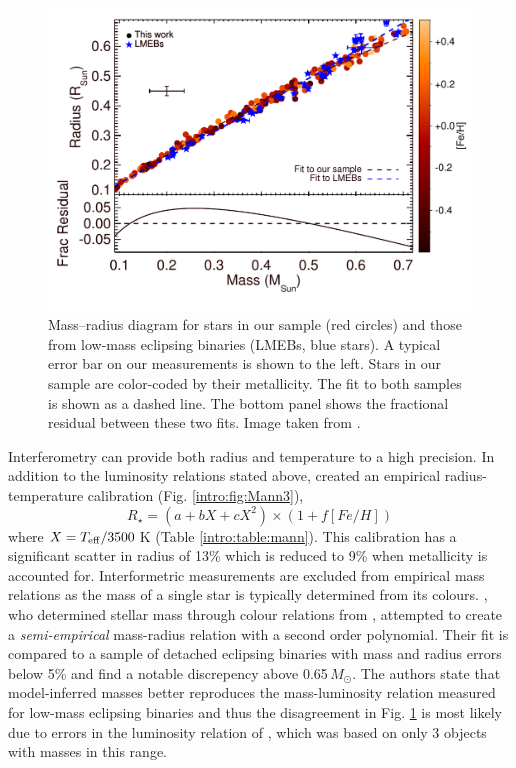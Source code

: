 \begin{figure}
    \centering
    \includegraphics[width=\textwidth]{3-images/f4.pdf}
    \caption{Mass--radius diagram for stars in our sample (red circles) and those from low-mass eclipsing binaries (LMEBs, blue stars). A typical error bar on our measurements is shown to the left. Stars in our sample are color-coded by their metallicity. The fit to both samples is shown as a dashed line. The bottom panel shows the fractional residual between these two fits. Image taken from \protect\citet{2015ApJ...804...64M}.}
    \label{intro:fig:Mann4}
\end{figure}


Interferometry can provide both radius and temperature to a high precision. In addition to the luminosity relations stated above, \citet{2015ApJ...804...64M} created an empirical radius-temperature calibration (Fig. \ref{intro:fig:Mann3}),
%
\begin{equation}
    R_\star = \left( a + bX + cX^2 \right) \times (1 + f[Fe/H])
\end{equation}
%
where $X = T_{\rm eff} / 3500$\,K (Table \ref{intro:table:mann}). This calibration has a significant scatter in radius of 13\% which is reduced to 9\% when metallicity is accounted for.  Interformetric measurements are excluded from empirical mass relations as the mass of a single star is typically determined from its colours. \citet{2015ApJ...804...64M}, who determined stellar mass through colour relations from \citet{2000A&A...364..217D}, attempted to create a \textit{semi-empirical} mass-radius relation with a second order polynomial. Their fit is compared to a sample of detached eclipsing binaries with mass and radius errors below 5\% and find a notable discrepency above 0.65\,$M_\odot$. The authors state that model-inferred masses better reproduces the mass-luminosity relation measured for low-mass eclipsing binaries and thus the disagreement in Fig. \ref{intro:fig:Mann4} is most likely due to errors in the luminosity relation of \citet{2000A&A...364..217D}, which was based on only 3 objects with masses in this range.


